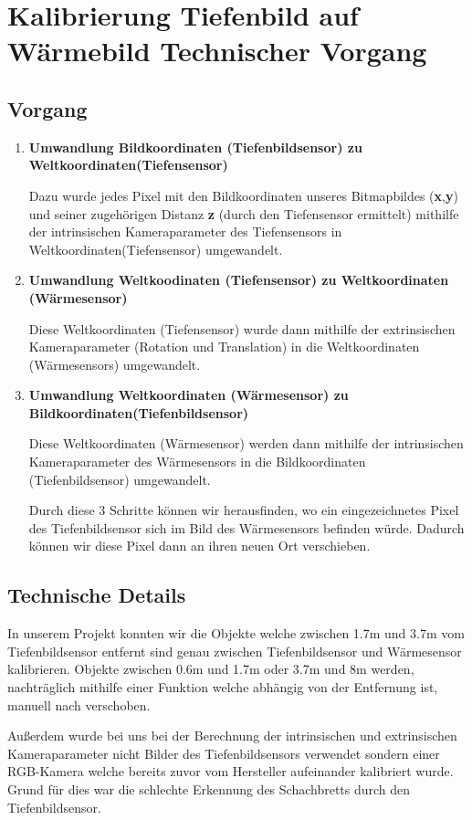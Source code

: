 \section{Kalibrierung Tiefenbild auf Wärmebild Technischer Vorgang}

\subsection{Vorgang}
\begin{enumerate}
	\item \textbf{Umwandlung Bildkoordinaten (\bzgl Tiefenbildsensor) zu Weltkoordinaten(\bzgl Tiefensensor)}
	
	Dazu wurde jedes Pixel mit den Bildkoordinaten unseres Bitmapbildes (\textbf{x},\textbf{y}) und seiner zugehörigen Distanz \textbf{z} (durch den Tiefensensor ermittelt) mithilfe der intrinsischen Kameraparameter des Tiefensensors in Weltkoordinaten(\bzgl Tiefensensor) umgewandelt.
	
	\item \textbf{Umwandlung Weltkoodinaten (\bzgl Tiefensensor) zu Weltkoordinaten (\bzgl Wärmesensor)}
	
	Diese Weltkoordinaten (\bzgl Tiefensensor) wurde dann mithilfe der extrinsischen Kameraparameter (Rotation und Translation) in die Weltkoordinaten (\bzgl Wärmesensors) umgewandelt.
	
	\item \textbf{Umwandlung Weltkoordinaten (\bzgl Wärmesensor) zu Bildkoordinaten(\bzgl Tiefenbildsensor)}
	
	Diese Weltkoordinaten (\bzgl Wärmesensor) werden dann mithilfe der intrinsischen Kameraparameter des Wärmesensors in die Bildkoordinaten (\bzgl Tiefenbildsensor) umgewandelt.
	
	Durch diese 3 Schritte können wir herausfinden, wo ein eingezeichnetes Pixel des Tiefenbildsensor sich im Bild des Wärmesensors befinden würde.
	Dadurch können wir diese Pixel dann an ihren neuen Ort verschieben.
\end{enumerate}

\subsection{Technische Details}
In unserem Projekt konnten wir die Objekte welche zwischen 1.7m und 3.7m vom Tiefenbildsensor entfernt sind genau zwischen Tiefenbildsensor und Wärmesensor kalibrieren.
Objekte zwischen 0.6m und 1.7m oder 3.7m und 8m werden, nachträglich mithilfe einer Funktion welche abhängig von der Entfernung ist, manuell nach verschoben.

Außerdem wurde bei uns bei der Berechnung der intrinsischen und extrinsischen Kameraparameter nicht Bilder des Tiefenbildsensors verwendet sondern einer RGB-Kamera welche bereits zuvor vom Hersteller aufeinander kalibriert wurde.
Grund für dies war die schlechte Erkennung des Schachbretts durch den Tiefenbildsensor.